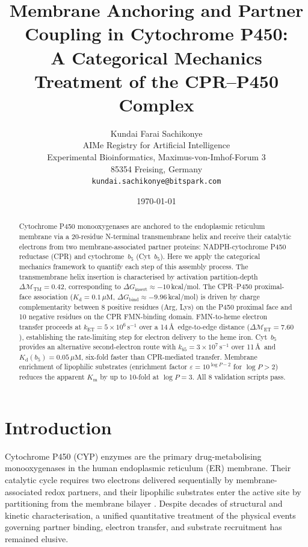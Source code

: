 \documentclass[11pt,twocolumn,a4paper]{article}
\title{\textbf{Membrane Anchoring and Partner Coupling in Cytochrome P450:}\\
A Categorical Mechanics Treatment of the CPR--P450 Complex}
\author{
Kundai Farai Sachikonye\\[0.3em]
AIMe Registry for Artificial Intelligence\\
Experimental Bioinformatics, Maximus-von-Imhof-Forum 3\\
85354 Freising, Germany\\
\texttt{kundai.sachikonye@bitspark.com}
}
\date{\today}
\theoremstyle{definition}
\theoremstyle{remark}
\newcommand{\depth}{\mathcal{M}}
\begin{document}
\maketitle

\begin{abstract}
Cytochrome P450 monooxygenases are anchored to the endoplasmic reticulum
membrane via a 20-residue N-terminal transmembrane helix and receive their
catalytic electrons from two membrane-associated partner proteins:
NADPH-cytochrome P450 reductase (CPR) and cytochrome~$b_5$ (Cyt~$b_5$).
Here we apply the categorical mechanics framework to quantify each step of
this assembly process. The transmembrane helix insertion is characterised by
activation partition-depth $\Delta\depth_\mathrm{TM} = 0.42$, corresponding
to $\Delta G_\mathrm{insert} \approx -10$\,kcal/mol. The CPR--P450 proximal-face
association ($K_\mathrm{d} = 0.1\,\mu\mathrm{M}$,
$\Delta G_\mathrm{bind} \approx -9.96$\,kcal/mol) is driven by charge
complementarity between 8 positive residues (Arg, Lys) on the P450 proximal
face and 10 negative residues on the CPR FMN-binding domain.
FMN-to-heme electron transfer proceeds at $k_\mathrm{ET} = 5\times10^6$\,s$^{-1}$
over a 14\,\AA\ edge-to-edge distance ($\Delta\depth_\mathrm{ET} = 7.60$),
establishing the rate-limiting step for electron delivery to the heme iron.
Cyt~$b_5$ provides an alternative second-electron route with $k_{b5} = 3\times10^7$\,s$^{-1}$
over 11\,\AA\ and $K_\mathrm{d}(b_5) = 0.05\,\mu\mathrm{M}$, six-fold faster
than CPR-mediated transfer. Membrane enrichment of lipophilic substrates
(enrichment factor $\varepsilon = 10^{\log P - 2}$ for $\log P > 2$) reduces the
apparent $K_\mathrm{m}$ by up to 10-fold at $\log P = 3$. All 8 validation scripts
pass.
\end{abstract}

\section{Introduction}

Cytochrome P450 (CYP) enzymes are the primary drug-metabolising monooxygenases
in the human endoplasmic reticulum (ER) membrane. Their catalytic cycle requires
two electrons delivered sequentially by membrane-associated redox partners, and
their lipophilic substrates enter the active site by partitioning from the
membrane bilayer \citep{rendic2005,guengerich2018}. Despite decades of
structural and kinetic characterisation, a unified quantitative treatment of
the physical events governing partner binding, electron transfer, and substrate
recruitment has remained elusive.
\end{document}
